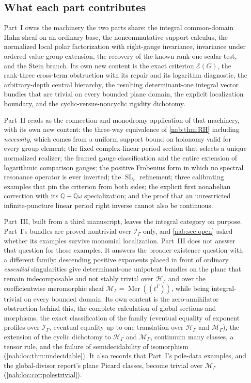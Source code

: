 \documentclass[11pt,letterpaper]{article}
\theoremstyle{definition}
\theoremstyle{remark}
\newcommand{\Q}{\mathbb Q}
\newcommand{\HH}{\mathscr H_\Gamma}
\newcommand{\II}{\mathscr I_\Gamma}
\newcommand{\SL}{\operatorname{SL}}
\newcommand{\EU}{\mathcal E}
\newcommand{\MM}{\mathscr M_\Gamma}
\newcommand{\Mer}{\operatorname{Mer}}
\numberwithin{equation}{section}
\begin{document}
\subsection{What each part contributes}

Part~I owns the machinery the two parts share: the integral common-domain
Hahn sheaf on an ordinary base, the noncommutative support calculus, the
normalized local polar factorization with right-gauge invariance, invariance
under ordered value-group extension, the recovery of the known rank-one
scalar test, and the Stein branch. Its own new content is the exact criterion
$\EU(G)$, the rank-three cross-term obstruction with its repair and its
logarithm diagnostic, the arbitrary-depth central hierarchy, the resulting
determinant-one integral vector bundles that are trivial on every bounded
plane domain, the explicit localization boundary, and the
cyclic-versus-noncyclic rigidity dichotomy.

Part~II reads as the connection-and-monodromy application of that machinery,
with its own new content: the three-way equivalence of
\cref{nab:thm:RH} including \emph{necessity}, which comes from a uniform
support bound on holonomy valid for every group element; the fixed
complex-linear period section that selects a unique normalized realizer; the
framed gauge classification and the entire extension of logarithmic
comparison gauges; the positive Frobenius form in which no spectral resonance
operator is ever inverted; the $\SL_r$ refinement; three calibrating examples
that pin the criterion from both sides; the explicit first nonabelian
correction with its $\Q+\Q\omega$ specialization; and the proof that an
unrestricted infinite-puncture linear period right inverse cannot also be
continuous.

Part~III, built from a third manuscript, leaves the integral category on
purpose. Part~I's bundles are proved nontrivial over $\II$ only, and
\cref{nab:sec:open} asked whether its examples survive monomial localization.
Part~III does not answer that question for those examples. It answers the
broader existence question with a different family: descending positive
exponents placed in front of ordinary \emph{essential} singularities give
determinant-one unipotent bundles on the plane that remain indecomposable and
not stably trivial over $\HH$ and over the coefficientwise meromorphic sheaf
$\MM=\Mer((t^\Gamma))$, while being integral-trivial on every bounded domain.
Its own content is the zero-annihilator obstruction behind this, the complete
calculation of global sections and morphisms, the exact classification of the
family (eventual equality of exponent profiles over $\II$, eventual equality up
to one translation over $\HH$ and $\MM$), the extension of the cyclic dichotomy
to $\HH$ and $\MM$, continuum many classes, a tensor rule, and the failure of
semidecidability of isomorphism (\cref{nab:loc:thm:undecidable}). It also
records that Part~I's pole-data examples, and the global-divisor report's plane
Picard classes, become trivial over $\MM$ (\cref{nab:loc:cor:polestrivial}).
\end{document}
